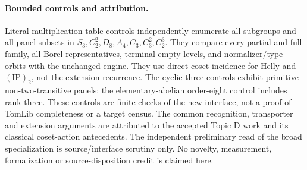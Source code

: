 \documentclass[11pt]{article}
\newcommand{\ip}{\mathrm{(IP)}_2}
\begin{document}
\paragraph{Bounded controls and attribution.}
Literal multiplication-table controls independently enumerate all subgroups
and all panel subsets in $S_3,C_2^2,D_8,A_4,C_3,C_3^2,C_2^3$.
They compare every partial and full family, all Borel representatives,
terminal empty levels, and normalizer/type orbits with the unchanged engine.
They use direct coset incidence for Helly and $\ip$, not the extension
recurrence. The cyclic-three controls exhibit primitive non-two-transitive
panels; the elementary-abelian order-eight control includes rank three.
These controls are finite checks of the new interface, not a proof of
TomLib completeness or a target census. The common recognition, transporter
and extension arguments are attributed to the accepted Topic D work and its
classical coset-action antecedents. The independent preliminary read of the
broad specialization is source/interface scrutiny only. No novelty,
measurement, formalization or source-disposition credit is claimed here.
\end{document}
